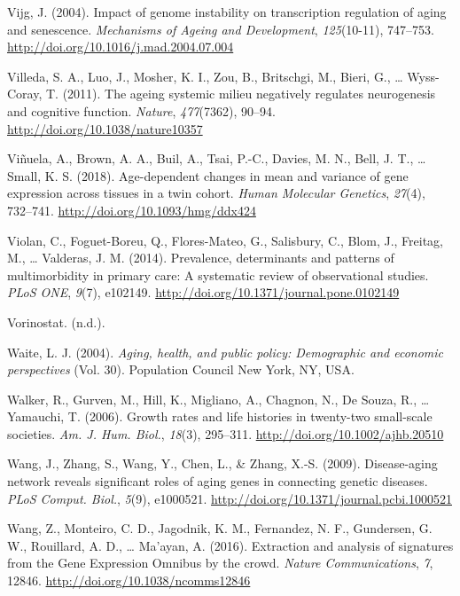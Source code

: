 \documentclass[12pt,twoside]{unicam}
\begin{document}
\begin{cslreferences}
\leavevmode\hypertarget{ref-Vijg2004}{}%
Vijg, J. (2004). Impact of genome instability on transcription regulation of aging and senescence. \emph{Mechanisms of Ageing and Development}, \emph{125}(10-11), 747--753. \url{http://doi.org/10.1016/j.mad.2004.07.004}

\leavevmode\hypertarget{ref-Villeda2011}{}%
Villeda, S. A., Luo, J., Mosher, K. I., Zou, B., Britschgi, M., Bieri, G., \ldots{} Wyss-Coray, T. (2011). The ageing systemic milieu negatively regulates neurogenesis and cognitive function. \emph{Nature}, \emph{477}(7362), 90--94. \url{http://doi.org/10.1038/nature10357}

\leavevmode\hypertarget{ref-Vinuela2018}{}%
Viñuela, A., Brown, A. A., Buil, A., Tsai, P.-C., Davies, M. N., Bell, J. T., \ldots{} Small, K. S. (2018). Age-dependent changes in mean and variance of gene expression across tissues in a twin cohort. \emph{Human Molecular Genetics}, \emph{27}(4), 732--741. \url{http://doi.org/10.1093/hmg/ddx424}

\leavevmode\hypertarget{ref-Violan2014}{}%
Violan, C., Foguet-Boreu, Q., Flores-Mateo, G., Salisbury, C., Blom, J., Freitag, M., \ldots{} Valderas, J. M. (2014). Prevalence, determinants and patterns of multimorbidity in primary care: A systematic review of observational studies. \emph{PLoS ONE}, \emph{9}(7), e102149. \url{http://doi.org/10.1371/journal.pone.0102149}

\leavevmode\hypertarget{ref-vorinostat}{}%
Vorinostat. (n.d.).

\leavevmode\hypertarget{ref-Waite2004}{}%
Waite, L. J. (2004). \emph{Aging, health, and public policy: Demographic and economic perspectives} (Vol. 30). Population Council New York, NY, USA.

\leavevmode\hypertarget{ref-Walker2006}{}%
Walker, R., Gurven, M., Hill, K., Migliano, A., Chagnon, N., De Souza, R., \ldots{} Yamauchi, T. (2006). Growth rates and life histories in twenty-two small-scale societies. \emph{Am. J. Hum. Biol.}, \emph{18}(3), 295--311. \url{http://doi.org/10.1002/ajhb.20510}

\leavevmode\hypertarget{ref-Wang2009}{}%
Wang, J., Zhang, S., Wang, Y., Chen, L., \& Zhang, X.-S. (2009). Disease-aging network reveals significant roles of aging genes in connecting genetic diseases. \emph{PLoS Comput. Biol.}, \emph{5}(9), e1000521. \url{http://doi.org/10.1371/journal.pcbi.1000521}

\leavevmode\hypertarget{ref-Wang2016}{}%
Wang, Z., Monteiro, C. D., Jagodnik, K. M., Fernandez, N. F., Gundersen, G. W., Rouillard, A. D., \ldots{} Ma'ayan, A. (2016). Extraction and analysis of signatures from the Gene Expression Omnibus by the crowd. \emph{Nature Communications}, \emph{7}, 12846. \url{http://doi.org/10.1038/ncomms12846}


\end{cslreferences}
\end{document}
